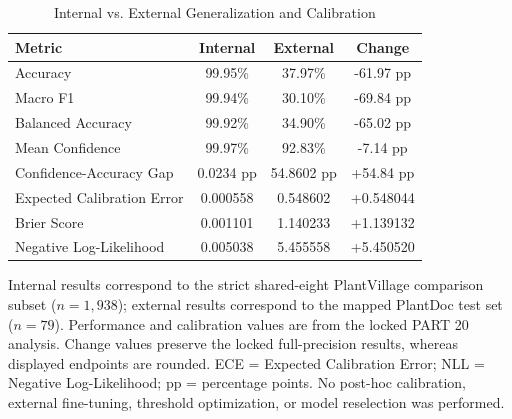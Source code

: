 \begin{table}[t]
\centering
\caption{Internal vs. External Generalization and Calibration}
\label{tab:generalization_calibration}
\begin{tabular}{lccc}
\hline
Metric & Internal & External & Change \\
\hline
Accuracy & 99.95\% & 37.97\% & -61.97 pp \\
Macro F1 & 99.94\% & 30.10\% & -69.84 pp \\
Balanced Accuracy & 99.92\% & 34.90\% & -65.02 pp \\
Mean Confidence & 99.97\% & 92.83\% & -7.14 pp \\
Confidence-Accuracy Gap & 0.0234 pp & 54.8602 pp & +54.84 pp \\
Expected Calibration Error & 0.000558 & 0.548602 & +0.548044 \\
Brier Score & 0.001101 & 1.140233 & +1.139132 \\
Negative Log-Likelihood & 0.005038 & 5.455558 & +5.450520 \\
\hline
\end{tabular}

\begin{flushleft}
\footnotesize
Internal results correspond to the strict shared-eight PlantVillage comparison subset ($n=1{,}938$); external results correspond to the mapped PlantDoc test set ($n=79$). Performance and calibration values are from the locked PART 20 analysis. Change values preserve the locked full-precision results, whereas displayed endpoints are rounded. ECE = Expected Calibration Error; NLL = Negative Log-Likelihood; pp = percentage points. No post-hoc calibration, external fine-tuning, threshold optimization, or model reselection was performed.
\end{flushleft}
\end{table}
